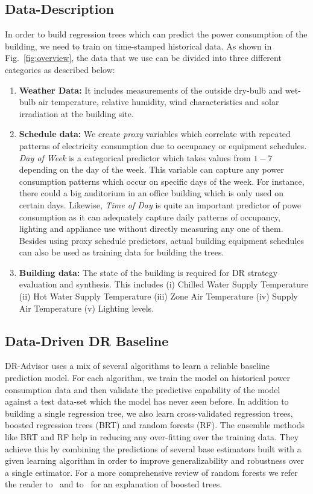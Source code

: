 \documentclass{sig-alternate-ipsn13}
\theoremstyle{definition}
\begin{document}
\subsection{Data-Description}

In order to build regression trees which can predict the power consumption of the building, we need to train on time-stamped historical data. As shown in Fig.~\ref{fig:overview}, the data that we use can be divided into three different categories as described below:
\begin{enumerate}[leftmargin=0.5cm,topsep=1pt,itemsep=-1ex,partopsep=1ex,parsep=1ex]
\item \textbf{Weather Data:} It includes measurements of the outside dry-bulb and wet-bulb air temperature, relative humidity, wind characteristics and solar irradiation at the building site.
\item \textbf{Schedule data:} We create \emph{proxy} variables which correlate with repeated patterns of electricity consumption \eg due to occupancy or equipment schedules. \emph{Day of Week} is a categorical predictor which takes values from $1-7$ depending on the day of the week. This variable can capture any power consumption patterns which occur on specific days of the week. For instance, there could a big auditorium in an office building which is only used on certain days. Likewise, \emph{Time of Day} is quite an important predictor of powe consumption as it can adequately capture daily patterns of occupancy, lighting and appliance use without directly measuring any one of them. Besides using proxy schedule predictors, actual building equipment schedules can also be used as training data for building the trees.
\item \textbf{Building data:} The state of the building is required for DR strategy evaluation and synthesis. This includes (i) Chilled Water Supply Temperature (ii) Hot Water Supply Temperature (iii) Zone Air Temperature (iv) Supply Air Temperature (v) Lighting levels.
\end{enumerate}

\subsection{Data-Driven DR Baseline}

DR-Advisor uses a mix of several algorithms to learn a reliable baseline prediction model. For each algorithm, we train the model on historical power consumption data and then validate the predictive capability of the model against a test data-set which the model has never seen before.
In addition to building a single regression tree, we also learn cross-validated regression trees, boosted regression trees (BRT) and random forests (RF). The ensemble methods like BRT and RF help in reducing any over-fitting over the training data. They achieve this by combining the predictions of several base estimators built with a given learning algorithm in order to improve generalizability and robustness over a single estimator.
For a more comprehensive review of random forests we refer the reader to~\cite{breiman2001random} and to~\cite{elith2008working} for an explanation of boosted trees.
\end{document}
